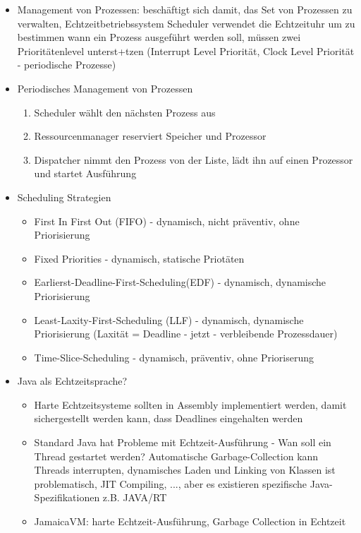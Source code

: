 \documentclass[paper=a4, fontsize=11pt]{scrartcl} %
\numberwithin{equation}{section} %
\numberwithin{figure}{section} %
\numberwithin{table}{section} %
\begin{document}
\begin{itemize}
\begin{itemize}
    \item Management von Prozessen: beschäftigt sich damit, das Set von Prozessen zu verwalten, Echtzeitbetriebssystem Scheduler verwendet die Echtzeituhr um zu bestimmen wann ein Prozess ausgeführt werden soll, müssen zwei Prioritätenlevel unterst+tzen (Interrupt Level Priorität, Clock Level Priorität - periodische Prozesse)
    \item Periodisches Management von Prozessen
    \begin{enumerate}
      \item Scheduler wählt den nächsten Prozess aus
      \item Ressourcenmanager reserviert Speicher und Prozessor
      \item Dispatcher nimmt den Prozess von der Liste, lädt ihn auf einen Prozessor und startet Ausführung
    \end{enumerate}
    \item Scheduling Strategien
    \begin{itemize}
      \item First In First Out (FIFO) - dynamisch, nicht präventiv, ohne Priorisierung
      \item Fixed Priorities - dynamisch, statische Priotäten
      \item Earlierst-Deadline-First-Scheduling(EDF) - dynamisch, dynamische Priorisierung
      \item Least-Laxity-First-Scheduling (LLF) - dynamisch, dynamische Priorisierung (Laxität = Deadline - jetzt - verbleibende Prozessdauer)
      \item Time-Slice-Scheduling - dynamisch, präventiv, ohne Prioriserung
    \end{itemize}
    \item Java als Echtzeitsprache?
    \begin{itemize}
      \item Harte Echtzeitsysteme sollten in Assembly implementiert werden, damit sichergestellt werden kann, dass Deadlines eingehalten werden
      \item Standard Java hat Probleme mit Echtzeit-Ausführung - Wan soll ein Thread gestartet werden? Automatische Garbage-Collection kann Threads interrupten, dynamisches Laden und Linking von Klassen ist problematisch, JIT Compiling, ..., aber es existieren spezifische Java-Spezifikationen z.B. JAVA/RT
      \item JamaicaVM: harte Echtzeit-Ausführung, Garbage Collection in Echtzeit
    \end{itemize}

\end{itemize}
\end{itemize}
\end{document}
